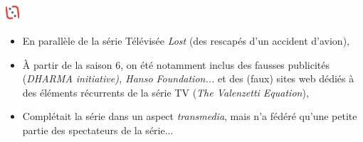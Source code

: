 \documentclass[slidetop,11pt]{beamer}
\def\moreInFrameTitleLeftt{\includegraphics[height=0.5cm]{img/ligueludique-0.png}~~~~~}
\begin{document}
\subsubsection{\sectionPartIIaIII}
\begin{frame}
	\frametitle{\moreInFrameTitleLeftt \sectionPartIIaIII }
	\begin{itemize}
		\item En parall{\`e}le de la s{\'e}rie T{\'e}l{\'e}vis{\'e}e \emph{Lost} (des rescap{\'e}s d'un accident d'avion), 
		\item {\`A} partir de la saison 6, on {\'e}t{\'e} notamment inclus des fausses publicit{\'e}s (\emph{DHARMA initiative), \emph{Hanso Foundation}...} et des (faux) sites web d{\'e}di{\'e}s {\`a} des {\'e}l{\'e}ments r{\'e}currents de la s{\'e}rie TV (\emph{The Valenzetti Equation}), 
		\item Compl{\'e}tait la s{\'e}rie dans un aspect \emph{transmedia}, mais n'a f{\'e}d{\'e}r{\'e} qu'une petite partie des spectateurs de la s{\'e}rie...
	\end{itemize}
\end{frame} 

\def\sectionPartIIaIV{The Lost Ring}
\end{document}
